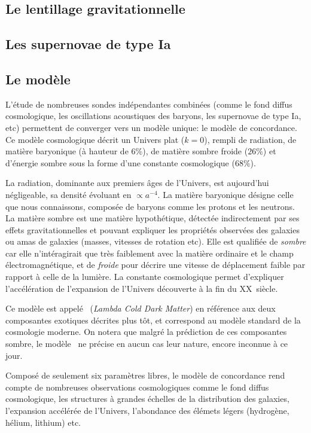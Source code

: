\documentclass[../main/main.tex]{subfiles}
\begin{document}
\subsection{Le lentillage gravitationnelle}


\subsection{Les supernovae de type Ia}

\subsection{Le modèle \lcdm}
L'étude de nombreuses sondes indépendantes combinées (comme le fond diffus
cosmologique, les oscillations acoustiques des baryons, les supernovae
de type Ia, etc) permettent de converger vers un modèle unique: le
modèle de concordance. Ce modèle cosmologique décrit un Univers plat
($k=0$), rempli de radiation, de  matière
baryonique (à hauteur de $6\%$), de matière sombre froide ($26\%$)
et d'énergie sombre sous la forme d'une constante cosmologique
($68\%$).

La radiation, dominante aux premiers âges de l'Univers, est aujourd'hui
négligeable, sa densité évoluant en $\propto a^{-4}$. La matière baryonique désigne celle que nous
connaissons, composée de baryons comme les protons et les neutrons. La
matière sombre est une matière hypothétique, détectée indirectement par
ses effets gravitationnelles et pouvant expliquer les propriétés
observées des galaxies ou amas de galaxies (masses, vitesses de
rotation etc). Elle est qualifiée de \textit{sombre} car elle n'intéragirait que
très faiblement avec la matière ordinaire et le champ
électromagnétique, et de \textit{froide} pour décrire une vitesse de
déplacement faible par rapport à celle de la lumière. La constante
cosmologique permet d'expliquer l'accélération de l'expansion de
l'Univers découverte à la fin du XX\ieme\ siècle.

Ce modèle est appelé \lcdm\ (\textit{Lambda Cold Dark Matter}) en
référence aux deux composantes exotiques décrites plus tôt, et
correspond au modèle standard de la cosmologie moderne. On notera que
malgré la prédiction de ces composantes sombre, le modèle \lcdm\ ne
précise en aucun cas leur nature, encore inconnue à ce jour.

Composé de seulement six paramètres libres, le modèle de concordance
rend compte de nombreuses observations cosmologiques comme le fond
diffus cosmologique, les structures à grandes échelles de la
distribution des galaxies, l'expansion accélérée de l'Univers,
l'abondance des élémets légers (hydrogène, hélium, lithium) etc.
\end{document}
